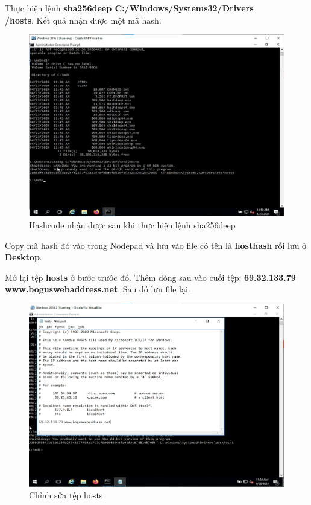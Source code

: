 \newpage
{} Thực hiện lệnh \textbf{sha256deep C:/Windows/Systems32/Drivers\\/hosts}. Kết quả nhận được một mã hash.

\begin{figure}[!htb]
    \centering
    \includegraphics[width=0.85\linewidth]{figure//chapter9//lab9_1/hashcode.png}
    \caption{Hashcode nhận được sau khi thực hiện lệnh sha256deep}
    \label{fig:enter-label}
\end{figure}

 Copy mã hash đó vào trong Nodepad và lưu vào file có tên là \textbf{hosthash} rồi lưu ở \textbf{Desktop}.

 Mở lại tệp \textbf{hosts} ở bước trước đó. Thêm dòng sau vào cuối tệp: \textbf{69.32.133.79 www.boguswebaddress.net}. Sau đó lưu file lại.

\begin{figure}[!htb]
    \centering
    \includegraphics[width=0.8\linewidth]{figure//chapter9//lab9_1/edit.png}
    \caption{Chỉnh sửa tệp hosts}
    \label{fig:enter-label}
\end{figure}


